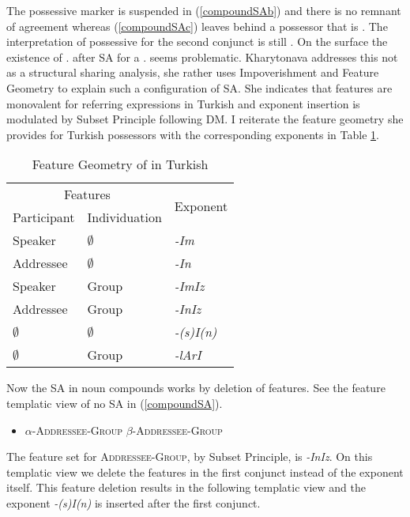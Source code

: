 The possessive marker is suspended in (\ref{compoundSAb}) and there is no remnant of agreement whereas (\ref{compoundSAc}) leaves behind a possessor that is {\Tsg}. The interpretation of possessive for the second conjunct is still {\Ssg}. On the surface the existence of {\Tsg}.{\Poss} after SA for a {\Ssg}.{\Poss} seems problematic. Kharytonava addresses this not as a structural sharing analysis, she rather uses Impoverishment and Feature Geometry to explain such a configuration of SA. She indicates that features are monovalent for referring expressions in Turkish and exponent insertion is modulated by Subset Principle following DM. I reiterate the feature geometry she provides for Turkish possessors with the corresponding exponents in Table \ref{tab:kharyfeatures}.

\begin{table}[hbt!]
    \caption{Feature Geometry of {\Poss} in Turkish}
    \centering
    \begin{tabular}{|l|l|l|}
    \hline
         \multicolumn{2}{|c|}{Features} & \multirow{2}{*}{Exponent}  \\ \cline{1-2}
         Participant & Individuation  & \\ \hline
         Speaker & $\emptyset$ & \textit{-Im} \\ \hline 
         Addressee & $\emptyset$ & \textit{-In} \\ \hline 
         Speaker & Group & \textit{-ImIz} \\ \hline 
         Addressee & Group & \textit{-InIz} \\ \hline 
         $\emptyset$ & $\emptyset$ & \textit{-(s)I(n)} \\ \hline 
         $\emptyset$ & Group & \textit{-lArI} \\ \hline 
    \end{tabular}
    \label{tab:kharyfeatures}
\end{table}

Now the SA in noun compounds works by deletion of features. See the feature templatic view of no SA in (\ref{compoundSA}).

\begin{itemize}
    \item $\alpha$-\textsc{Addressee}-\textsc{Group} {\And} $\beta$-{\textsc{Addressee}-\textsc{Group}}
\end{itemize}

The feature set for \textsc{Addressee}-\textsc{Group}, by Subset Principle, is \textit{-InIz}. On this templatic view we delete the features in the first conjunct instead of the exponent itself. This feature deletion results in the following templatic view and the exponent \textit{-(s)I(n)} is inserted after the first conjunct.

